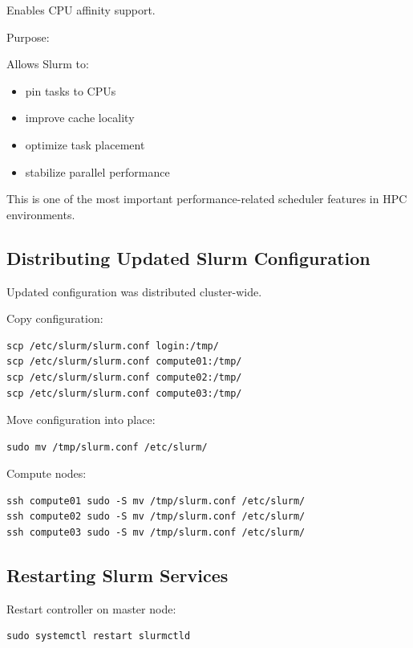 \documentclass[11pt]{article}
\begin{document}
\begin{enumerate}
Enables CPU affinity support.

Purpose:

Allows Slurm to:

\begin{itemize}
\item pin tasks to CPUs
\item improve cache locality
\item optimize task placement
\item stabilize parallel performance
\end{itemize}

This is one of the most important performance-related scheduler
features in HPC environments.
\end{enumerate}
\subsection{Distributing Updated Slurm Configuration}
\label{sec:org382fedd}

Updated configuration was distributed cluster-wide.

Copy configuration:

\begin{verbatim}
scp /etc/slurm/slurm.conf login:/tmp/
scp /etc/slurm/slurm.conf compute01:/tmp/
scp /etc/slurm/slurm.conf compute02:/tmp/
scp /etc/slurm/slurm.conf compute03:/tmp/
\end{verbatim}

Move configuration into place:

\begin{verbatim}
sudo mv /tmp/slurm.conf /etc/slurm/
\end{verbatim}

Compute nodes:

\begin{verbatim}
ssh compute01 sudo -S mv /tmp/slurm.conf /etc/slurm/
ssh compute02 sudo -S mv /tmp/slurm.conf /etc/slurm/
ssh compute03 sudo -S mv /tmp/slurm.conf /etc/slurm/
\end{verbatim}
\subsection{Restarting Slurm Services}
\label{sec:org15a4385}

Restart controller on master node:

\begin{verbatim}
sudo systemctl restart slurmctld
\end{verbatim}
\end{document}
